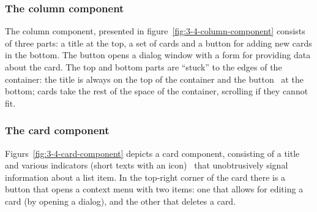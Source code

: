 \subsubsection{The column component}
The column component, presented in figure~\ref{fig:3-4-column-component} consists of three parts: a title at the top, a set of cards and a button for adding new cards in the bottom.
The button opens a dialog window with a form for providing data about the card.
The top and bottom parts are \enquote{stuck} to the edges of the container: the title is always on the top of the container and the button \textendash\ at the bottom;
cards take the rest of the space of the container, scrolling if they cannot fit.

\subsubsection{The card component}
Figurs~\ref{fig:3-4-card-component} depicts a card component, consisting of a title and various indicators (short texts with an icon) \textendash\ that unobtrusively signal information about a list item.
In the top-right corner of the card there is a button that opens a context menu with two items: one that allows for editing a card (by opening a dialog), and the other that deletes a card.


